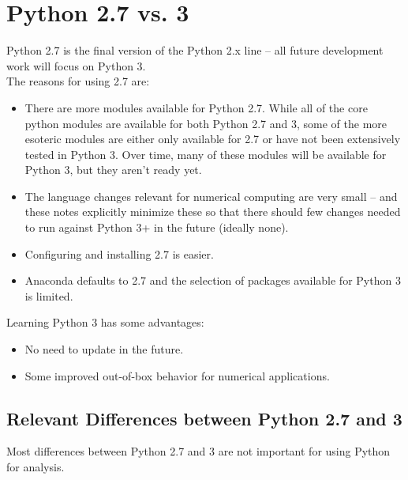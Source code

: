 \documentclass[Pydata.tex]{subfiles}
\begin{document}
 
\section{Python 2.7 vs. 3}
Python 2.7 is the final version of the Python 2.x line – all future development work will focus on Python 3.\\

\noindent The reasons for using 2.7 are:
\begin{itemize}
\item There are more modules available for Python 2.7. While all of the core python modules are available
for both Python 2.7 and 3, some of the more esoteric modules are either only available for 2.7 or
have not been extensively tested in Python 3. Over time, many of these modules will be available for
Python 3, but they aren’t ready yet.
\item The language changes relevant for numerical computing are very small – and these notes explicitly
minimize these so that there should few changes needed to run against Python 3+ in the future
(ideally none).
\item Configuring and installing 2.7 is easier.
\item Anaconda defaults to 2.7 and the selection of packages available for Python 3 is limited.
\end{itemize}
Learning Python 3 has some advantages:
\begin{itemize}
\item No need to update in the future.
\item Some improved out-of-box behavior for numerical applications.
\end{itemize}

\subsection{Relevant Differences between Python 2.7 and 3}
Most differences between Python 2.7 and 3 are not important for using Python for analysis. 

\end{document}
